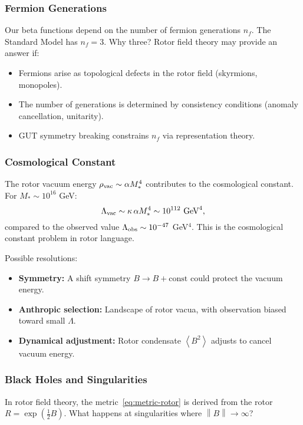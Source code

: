 \documentclass[11pt,a4paper]{article}
\numberwithin{equation}{section}
\theoremstyle{plain}
\theoremstyle{definition}
\theoremstyle{remark}
\newcommand{\norm}[1]{\left\lVert#1\right\rVert}
\newcommand{\avg}[1]{\left\langle #1 \right\rangle}
\begin{document}
\subsubsection{Fermion Generations}

Our beta functions depend on the number of fermion generations $n_f$. The Standard Model has $n_f=3$. Why three? Rotor field theory may provide an answer if:
\begin{itemize}
  \item Fermions arise as topological defects in the rotor field (skyrmions, monopoles).
  \item The number of generations is determined by consistency conditions (anomaly cancellation, unitarity).
  \item GUT symmetry breaking constrains $n_f$ via representation theory.
\end{itemize}

\subsubsection{Cosmological Constant}

The rotor vacuum energy $\rho_{\rm vac}\sim \alpha M_*^4$ contributes to the cosmological constant. For $M_*\sim 10^{16}$ GeV:
\begin{equation}
\Lambda_{\rm vac} \sim \kappa\,\alpha M_*^4 \sim 10^{112}\text{ GeV}^4,
\label{eq:Lambda-vac}
\end{equation}
compared to the observed value $\Lambda_{\rm obs}\sim 10^{-47}$ GeV$^4$. This is the cosmological constant problem in rotor language.

Possible resolutions:
\begin{itemize}
  \item \textbf{Symmetry:} A shift symmetry $B\to B+\text{const}$ could protect the vacuum energy.
  \item \textbf{Anthropic selection:} Landscape of rotor vacua, with observation biased toward small $\Lambda$.
  \item \textbf{Dynamical adjustment:} Rotor condensate $\avg{B^2}$ adjusts to cancel vacuum energy.
\end{itemize}

\subsubsection{Black Holes and Singularities}

In rotor field theory, the metric~\eqref{eq:metric-rotor} is derived from the rotor $R=\exp(\tfrac12 B)$. What happens at singularities where $\norm{B}\to\infty$?
\end{document}
